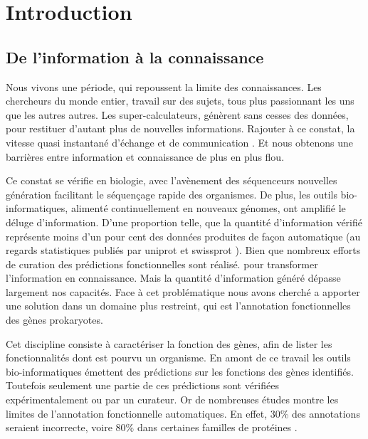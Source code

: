 \chapter{Introduction}
\section{De l'information à la connaissance}
Nous vivons une période, qui repoussent la limite des connaissances. Les chercheurs du monde entier, travail sur des sujets, tous plus passionnant les uns que les autres autres. Les super-calculateurs, génèrent sans cesses des données, pour restituer d'autant plus de nouvelles informations. Rajouter à ce constat, la vitesse quasi instantané d'échange et de communication . Et nous obtenons une barrières entre information et connaissance de plus en plus flou.

Ce constat se vérifie en biologie, avec l'avènement des séquenceurs nouvelles génération facilitant le séquençage rapide des organismes. De plus, les outils bio-informatiques, alimenté continuellement en nouveaux génomes, ont amplifié le déluge d'information. D'une proportion telle, que la quantité d'information vérifié représente moins d'un pour cent des données produites de façon automatique (au regards statistiques publiés par uniprot et swissprot \parencites{uniprot_stat}{expasy_stat} ). Bien que nombreux efforts de curation des prédictions fonctionnelles sont réalisé. pour transformer l'information en connaissance. Mais la quantité d'information généré dépasse largement nos capacités. Face à cet problématique nous avons cherché a apporter une solution dans un domaine plus restreint, qui est l'annotation fonctionnelles des gènes prokaryotes.

Cet discipline consiste à caractériser la fonction des gènes, afin de lister les fonctionnalités dont est pourvu un organisme. En amont de ce travail les outils bio-informatiques émettent des prédictions sur les fonctions des gènes identifiés. Toutefois seulement une partie de ces prédictions sont vérifiées expérimentalement ou par un curateur. Or de nombreuses études montre les limites de l'annotation fonctionnelle automatiques. En effet, 30\% des annotations seraient incorrecte, voire 80\% dans certaines familles de protéines \parencites{devos2001intrinsic}{schnoes2009annotation}.





